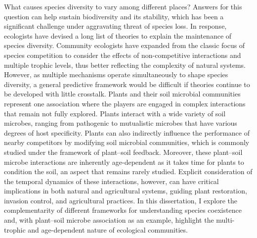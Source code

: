 What causes species diversity to vary among different places? Answers for this question can help sustain biodiversity and its stability, which has been a significant challenge under aggravating threat of species loss. In response, ecologists have devised a long list of theories to explain the maintenance of species diversity. Community ecologists have expanded from the classic focus of species competition to consider the effects of non-competitive interactions and multiple trophic levels, thus better reflecting the complexity of natural systems. However, as multiple mechanisms operate simultaneously to shape species diversity, a general predictive framework would be difficult if theories continue to be developed with little crosstalk. Plants and their soil microbial communities represent one association where the players are engaged in complex interactions that remain not fully explored. Plants interact with a wide variety of soil microbes, ranging from pathogenic to mutualistic microbes that have various degrees of host specificity. Plants can also indirectly influence the performance of nearby competitors by modifying soil microbial communities, which is commonly studied under the framework of plant--soil feedback. Moreover, these plant--soil microbe interactions are inherently age-dependent as it takes time for plants to condition the soil, an aspect that remains rarely studied. Explicit consideration of the temporal dynamics of these interactions, however, can have critical implications in both natural and agricultural systems, guiding plant restoration, invasion control, and agricultural practices. In this dissertation, I explore the complementarity of different frameworks for understanding species coexistence and, with plant--soil microbe association as an example, highlight the multi-trophic and age-dependent nature of ecological communities. 

